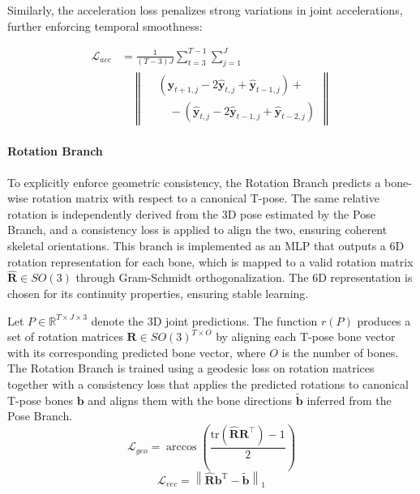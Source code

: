 \documentclass[11pt,a4paper,twocolumn]{article}
\begin{document}
Similarly, the acceleration loss penalizes strong variations in joint accelerations, further enforcing temporal smoothness:

{\small
\begin{equation}
    \begin{split}
    \mathcal{L}_{acc} &= \frac{1}{(T-3)J}
    \sum_{t=3}^{T-1} \sum_{j=1}^{J} \\
    &\quad \left\| \begin{aligned}
        &(\hat{\mathbf{y}}_{t+1,j} - 2\hat{\mathbf{y}}_{t,j} + \hat{\mathbf{y}}_{t-1,j}) + \\
        &\quad - (\hat{\mathbf{y}}_{t,j} - 2\hat{\mathbf{y}}_{t-1,j} + \hat{\mathbf{y}}_{t-2,j})
    \end{aligned} \right\|
    \end{split}
\end{equation}
}

\paragraph{Rotation Branch}
To explicitly enforce geometric consistency, the Rotation Branch predicts a bone-wise rotation matrix with respect to a canonical T-pose. The same relative rotation is independently derived from the 3D pose estimated by the 
Pose Branch, and a consistency loss is applied to align the two, ensuring coherent skeletal orientations.
This branch is implemented as an MLP that outputs a 6D rotation representation for each bone, which is mapped to a valid rotation matrix $ \mathbf{\hat{R}} \in SO(3) $ through Gram-Schmidt orthogonalization.
The 6D representation is chosen for its continuity properties, ensuring stable learning.

Let $ P \in \mathbb{R}^{T \times J \times 3} $ denote the 3D joint predictions.
The function $r(P)$ produces a set of rotation matrices $ \mathbf{R} \in SO(3)^{T \times O} $ by aligning each T-pose bone vector with its corresponding predicted bone vector, where $O$ is the number of bones.
The Rotation Branch is trained using a geodesic loss on rotation matrices together with a consistency loss that applies the predicted rotations to canonical T-pose bones $\mathbf{b}$ and aligns them with the bone directions $\tilde{\mathbf{b}}$ inferred from the Pose Branch.
\begin{equation}
    \mathcal{L}_{geo} = \arccos \left( \frac{\text{tr}(\hat{\mathbf{R}} \mathbf{R}^\top) - 1}{2} \right)
\end{equation}
\begin{equation}
    \mathcal{L}_{vec} = \left\| \hat{\mathbf{R}} \mathbf{b}^{\text{T}} - \tilde{\mathbf{b}} \right\|_1
\end{equation}
\end{document}

